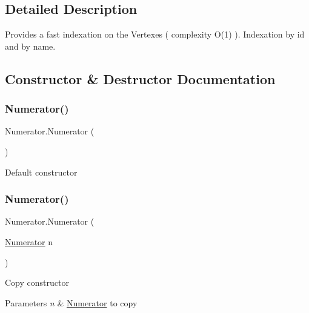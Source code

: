 \subsection{Detailed Description}
Provides a fast indexation on the Vertexes ( complexity O(1) ). Indexation by id and by name. 



\subsection{Constructor \& Destructor Documentation}
\mbox{\label{classNumerator_a2c146868937564adc3e68759ebf66e25}} 
\subsubsection{\texorpdfstring{Numerator()}{Numerator()}\hspace{0.1cm}{\footnotesize\ttfamily [1/2]}}
{\footnotesize\ttfamily Numerator.\+Numerator (\begin{DoxyParamCaption}{ }\end{DoxyParamCaption})\hspace{0.3cm}{\ttfamily [inline]}}



Default constructor 

\mbox{\label{classNumerator_a76d3d2a8cea83a945b332b11945bcaf3}} 
\subsubsection{\texorpdfstring{Numerator()}{Numerator()}\hspace{0.1cm}{\footnotesize\ttfamily [2/2]}}
{\footnotesize\ttfamily Numerator.\+Numerator (\begin{DoxyParamCaption}\item[{\hyperlink{classNumerator}{Numerator}}]{n }\end{DoxyParamCaption})\hspace{0.3cm}{\ttfamily [inline]}}



Copy constructor 


\begin{DoxyParams}{Parameters}
{\em n} & \hyperlink{classNumerator}{Numerator} to copy\\
\hline
\end{DoxyParams}


